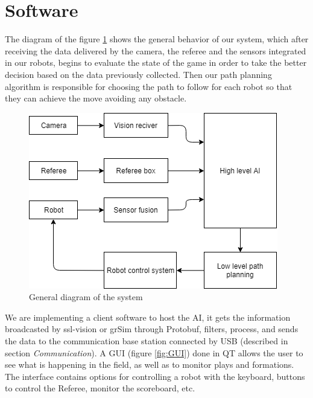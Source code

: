 \documentclass{llncs}
\begin{document}
\section{Software}
The diagram of the figure \ref{fig:gDiagram} shows the general behavior of our system, which after receiving the data delivered by the camera, the referee and the sensors integrated in our robots, begins to evaluate the state of the game in order to take the better decision based on the data previously collected. Then our path planning algorithm is responsible for choosing the path to follow for each robot so that they can achieve the move avoiding any obstacle.

\begin{figure}[H]
    \centering
    \includegraphics[scale=0.5]{gDiagram.png}
    \caption{General diagram of the system}
    \label{fig:gDiagram}
\end{figure}

We are implementing a client software to host the AI, it gets the information broadcasted by ssl-vision or grSim through Protobuf, filters, process, and sends the data to the communication base station connected by USB (described in section \textit{Communication}). A GUI (figure \ref{fig:GUI}) done in QT allows the user to see what is happening in the field, as well as to monitor plays and formations. The interface contains options for controlling a robot with the keyboard, buttons to control the Referee, monitor the scoreboard, etc.
\end{document}
